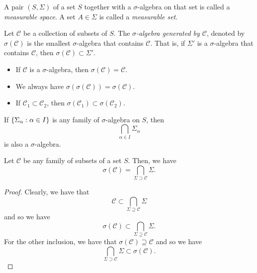\documentclass[12pt]{book}
\begin{document}
\begin{definition}
A pair \( (S, \Sigma) \) of a set \( S \) together with a \( \sigma \)-algebra on that set is called a \emph{measurable space}.
A set \( A \in \Sigma \) is called a \emph{measurable set}.
\end{definition}

\begin{definition}
Let \( \mathcal C \) be a collection of subsets of \( S \).
The \emph{\( \sigma \)-algebra generated by \( \mathcal C \)}, denoted by \( \sigma(\mathcal C) \) is the smallest \( \sigma \)-algebra that contains \( \mathcal C \).
That is, if \( \Sigma' \) is a \( \sigma \)-algebra that contains \( \mathcal C \), then \( \sigma(\mathcal C) \subset \Sigma' \).
\end{definition}

\begin{note} \skipline
\begin{itemize}
\item If \( \mathcal C \) is a \( \sigma \)-algebra, then \( \sigma(\mathcal C) = \mathcal C \).
\item We always have \( \sigma(\sigma(\mathcal C)) = \sigma(\mathcal C) \).
\item If \( \mathcal C_1 \subset \mathcal C_2 \), then \( \sigma(\mathcal C_1) \subset \sigma(\mathcal C_2) \).
\end{itemize}
\end{note}

\begin{proposition}
If \( \{\Sigma_\alpha : \alpha \in I\} \) is any family of \( \sigma \)-algebra on \( S \), then
\[ \bigcap_{\alpha \in I} \Sigma_\alpha \]
is also a \( \sigma \)-algebra.
\end{proposition}

\begin{proposition}
Let \( \mathcal C \) be any family of subsets of a set \( S \).
Then, we have
\[ \sigma(\mathcal C) = \bigcap_{\Sigma \supset \mathcal C} \Sigma. \]
\end{proposition}

\begin{proof}
Clearly, we have that
\[ \mathcal C \subset \bigcap_{\Sigma \supseteq \mathcal C} \Sigma \]
and so we have
\[ \sigma(\mathcal C) \subset \bigcap_{\Sigma \supseteq \mathcal C} \Sigma. \]
For the other inclusion, we have that \( \sigma(\mathcal C) \supseteq \mathcal C \) and so we have
\[ \bigcap_{\Sigma \supset \mathcal C} \Sigma \subset \sigma(\mathcal C). \]
\end{proof}
\end{document}
